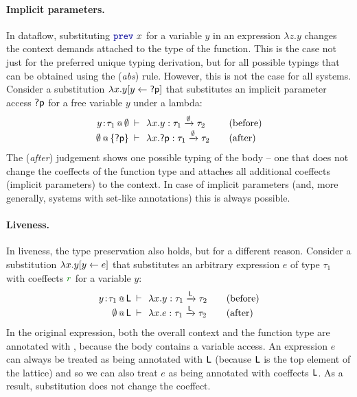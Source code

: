 \paragraph{Implicit parameters.} In dataflow, substituting $\kvd{prev}~x$ for a variable $y$ in
an expression $\lambda z.y$ changes the context demands attached to the type of the function.
This is the case not just for the preferred unique typing derivation, but for all possible typings
that can be obtained using the (\emph{abs}) rule. However, this is not the case for all
systems. Consider a substitution $\lambda x.y[y \leftarrow \textnormal{\sffamily ?p}]$ that substitutes
an implicit parameter access $\textnormal{\sffamily ?p}$ for a free variable $y$ under a lambda:
%
\begin{equation*}
\begin{array}{rclcl}
 \coctx{y\!:\!\tau_1}{\emptyset} &\narrow{\vdash}& \lambda x.y : \tau_1 \xrightarrow{\emptyset} \tau_2 & & (\textnormal{before}) \\
 \coctx{\emptyset}{ \{\ident{?p}\} } &\narrow{\vdash}& \lambda x.\ident{?p} : \tau_1 \xrightarrow{\emptyset} \tau_2 & & (\textnormal{after}) \\
\end{array}
\end{equation*}
%
The (\emph{after}) judgement shows one possible typing of the body -- one that does not change the
coeffects of the function type and attaches all additional coeffects (implicit parameters) to the
context. In case of implicit parameters (and, more generally, systems with set-like annotations)
this is always possible.

\paragraph{Liveness.} In liveness, the type preservation also holds, but for a different reason. Consider
a substitution $\lambda x.y[y \leftarrow e]$ that substitutes an arbitrary expression $e$ of
type $\tau_1$ with coeffects $\cclrd{r}$ for a variable $y$:
%
\begin{equation*}
\begin{array}{rclcl}
 \coctx{y\!:\!\tau_1}{\ident{L}} &\narrow{\vdash}& \lambda x.y : \tau_1 \xrightarrow{\ident{L}} \tau_2 & & (\textnormal{before}) \\
 \coctx{\emptyset}{\ident{L}} &\narrow{\vdash}& \lambda x.e : \tau_1 \xrightarrow{\ident{L}} \tau_2 & & (\textnormal{after}) \\
\end{array}
\end{equation*}
%
In the original expression, both the overall context and the function type are annotated with ,
because the body contains a variable access. An expression $e$ can always be treated as being annotated
with $\textnormal{\sffamily L}$ (because $\textnormal{\sffamily L}$ is the top element of the lattice) and so we can also treat $e$
as being annotated with coeffects $\textnormal{\sffamily L}$. As a result, substitution does not change the coeffect.

